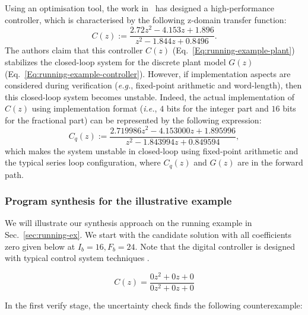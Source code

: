 \documentclass{sig-alternate-05-2015}
\newcommand{\red}[1]{{\color{red}#1}}
\begin{document}
Using an optimisation tool, the work in~\cite{DBLP:conf/hybrid/WangGRJF16}
has designed a high-performance controller, which is characterised by the
following z-domain transfer function:
%
\begin{equation}
\label{Eq:running-example-controller}
C\left(z\right) := \frac{2.72z^2 - 4.153z + 1.896}{z^2 - 1.844z + 0.8496}.
\end{equation}
%
The authors claim that this controller $C(z)$ (Eq.~\eqref{Eq:running-example-plant}) 
stabilizes the closed-loop system for the discrete plant model $G(z)$ (Eq.~\ref{Eq:running-example-controller}).  
However, if implementation aspects are considered during verification ({\it e.g.}, fixed-point
arithmetic and word-length), then this closed-loop system becomes unstable.
%
Indeed, the actual implementation of $C(z)$ using 
implementation format ({\it i.e.}, $4$ bits for the integer part and $16$
bits for the fractional part) can be represented by the following
expression:
%
\begin{equation}
\label{Eq:running-example-controller-quantised}
C_{q}\left(z\right) {:=} \frac{2.719986z^2{-}4.153000z
{+}1.895996}{z^2{-}1.843994z+0.849594},
\end{equation} 
%
which makes the system unstable in closed-loop using fixed-point arithmetic
and the typical series loop configuration, where $C_{q}\left(z\right)$ and
$G\left(z\right)$ are in the forward path.


\subsubsection{Program synthesis for the illustrative example}
We will illustrate our synthesis approach on the running example 
in Sec.~\ref{sec:running-ex}.
We start with the candidate solution with all coefficients zero 
given below at $I_b=16,F_b=24$.
Note that the digital controller is designed with typical control system
techniques \cite{Kuo:2002:ACS:579453,Ogata:1987:DCS:26170}.

$$
C(z)=\frac{0z^2{+}0z{+}0}{0z^2{+}0z{+}0}
$$

In the first {\sc verify} stage, the {\sc uncertainty} 
check finds the following counterexample:
\end{document}
